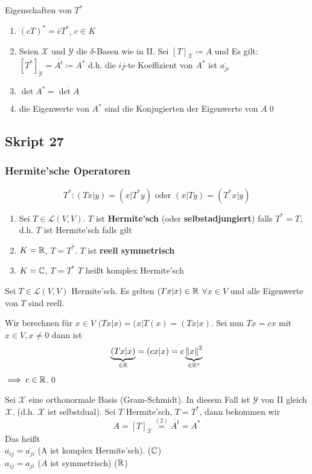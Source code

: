 Eigenschaften von $ T^* $ 
\begin{enumerate}[label=(\arabic*)]
	\item $ (cT)^* = \overline{c} T^* $, $ c \in K $ 
	\item Seien $ \mathcal{X} $ und $ \mathcal{Y}  $ die $ \delta $-Basen wie in II.
		Sei $ [T]_{\mathcal{X} } \coloneqq A $ und
		Es gilt: $ [T^*]_\mathcal{Y} = \overline{A^{t} } \coloneqq A^{*}  $ d.h. die $ ij $-te Koeffizient von $ A^* $ ist $ \overline{a_{ji} }  $ 
	\item $ \det A^* = \overline{\det A}  $ 
	\item die Eigenwerte von $ A^{*}  $ sind die Konjugierten der Eigenwerte von $ A $\qed
\end{enumerate}

\subsection{Skript 27}
\setcounter{subsubsection}{16}
\subsubsection{Hermite'sche Operatoren}
\[
	T^* : (Tx |y) = (x | T^*y) \text{ oder } (x | Ty) = (T^*x | y)
\]
\begin{subdefinition}
	\begin{enumerate}[label=(\roman*)]
		\item Sei $ T \in \mathcal{L} (V, V) $.
			$ T $ ist \textbf{Hermite'sch} (oder \textbf{selbstadjungiert}) falls $ T^* = T $, d.h. $ T $ ist Hermite'sch falls gilt
		\item $ K = \mathbb{R}  $, $ T = T^* $. $ T $ ist \textbf{reell symmetrisch}
		\item $ K = \mathbb{C}  $, $ T = T^* $ $ T $ heißt komplex Hermite'sch
	\end{enumerate}
\end{subdefinition}

\begin{subtheorem}
	Sei $ T \in \mathcal{L} (V, V) $ Hermite'sch.
	Es gelten $ (Tx | x) \in \mathbb{R}  $ $ \forall x \in V $ und alle Eigenwerte von $ T $ sind reell.
\end{subtheorem}
\begin{subproof*}
	Wir berechnen für $ x \in V $ 
	$ (Tx | x) = (x | T(x) = (Tx | x) $.
	Sei nun $ Tx = cx $ mit $ x \in V, x \neq 0 $ dann ist
	\[
		\underbrace{(Tx | x)}_{\in \mathbb{R} } = (c x | x) = c \underbrace{\left\| x \right\| ^2}_{\in \mathbb{R} ^x}
	\]
	$ \implies c \in \mathbb{R}  $.\qed
\end{subproof*}

\begin{subnote}[Matrixdarstellung]
	Sei $ \mathcal{X}  $ eine orthonormale Basis (Gram-Schmidt). In diesem Fall ist $ \mathcal{Y}  $ von II gleich $ \mathcal{X}  $. (d.h. $ \mathcal{X}  $ ist selbstdual).
	Sei $ T $ Hermite'sch, $ T = T^* $, dann bekommen wir
	\[
		A = [T]_{\mathcal{X} } \overset{(2)}{=} \overline{A^t} = A^*
	\]
	Das heißt\\
	$ a_{ij} = \overline{a_{ji} }  $ (A ist komplex Hermite'sch). ($ \mathbb{C}  $)\\
	$ a_{ij} = a_{ji} $ ($ A $ ist symmetrisch) ($ \mathbb{R}  $)
\end{subnote}


